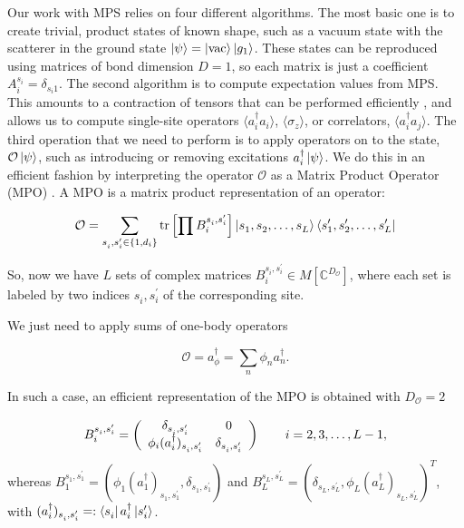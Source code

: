 \documentclass[notitlepage, prx, preprint, amsmath,superscriptaddress,amssymb]{revtex4-1}
\begin{document}
Our work with MPS relies on four different algorithms. The most basic one is to create trivial, product states of known shape, such as a vacuum state with the scatterer in the ground state $\ket{\psi}=\ket{\text{vac}} \ket{g_1}$. These states can be reproduced using matrices of bond dimension $D=1$, so each matrix is just a coefficient $A_i^{s_i}=\delta_{s_i1}$. The second algorithm is to compute expectation values from MPS. This amounts to a contraction of tensors that can be performed efficiently \cite{Ripoll2006}, and allows us to compute single-site operators $\langle a^\dagger_i a_i\rangle$, $\langle \sigma_z\rangle$, or correlators, $\langle a_i^\dagger a_j\rangle$. The third operation that we need to perform is to apply operators on to the state, $\mathcal{O}\ket{\psi}$, such as introducing or removing excitations $a_i^\dagger\ket{\psi}$. We do this in an efficient fashion by interpreting the operator $\mathcal{O}$ as a Matrix Product Operator (MPO) \cite{Pirvu2010}. A MPO is a matrix product representation of an operator:

\begin{equation}
\mathcal{O} = \sum_{s_{i}^{},s_{i}^\prime \in \{1,d_i\}} \mathrm{tr}\left[\prod B_i^{s_i^{},s_i^\prime}\right]\ket{s_1^{},s_2^{},\ldots,s_L^{}}\bra{s_1^\prime,s_2^\prime,\ldots,s_L^\prime}
\end{equation}

So, now we have $L$ sets of complex matrices $B_i^{s_i^{},s_i^\prime} \in M[\mathbb{C}^{D_\mathcal{O}}]$, where each set is labeled by two indices $s_i^{},s_i^\prime$ of the corresponding site.

We just need to apply sums of one-body operators

\begin{equation}
\mathcal{O} = a_\phi^\dagger = \sum_n \phi_n a_n^\dagger.
\end{equation}

In such a case, an efficient representation of the MPO is obtained with $D_\mathcal{O}=2$

\begin{equation}
B_i^{s_i^{},s_i^\prime}=\left(\begin{array}{c c}
\delta_{s_i^{},s_i^\prime} & 0\\
\phi_i(a_i^\dagger)_{s_i^{},s_i^\prime} & \delta_{s_i^{},s_i^\prime}
\end{array}\right)\qquad i=2,3,\dots,L-1,
\end{equation}
whereas $B_1^{s_1^{},s_1^\prime}=(\phi_1(a_1^\dagger)_{s_1^{},s_1^\prime},\delta_{s_1^{},s_1^\prime})$ and $B_L^{s_L^{},s_L^\prime}=(\delta_{s_L^{},s_L^\prime},\phi_L(a_L^\dagger)_{s_L^{},s_L^\prime})^T$, with $(a_i^\dagger)_{s_i^{},s_i^\prime}=:\bra{s_i^{}}a_i^\dagger\ket{s_i^\prime}$.
\end{document}
